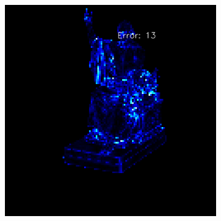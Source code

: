 \begin{figure}
\begin{subfigure}[b]{0.19\linewidth}
	\end{subfigure}
	\begin{subfigure}[b]{0.19\linewidth}
		\includegraphics[width=\linewidth]{./Figures/gcnn_synthetic/fancy_eval_3_error_an2-8-1000.png}
	\end{subfigure}
	
	
	

\end{figure}
